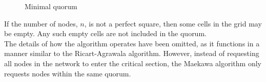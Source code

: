 \begin{figure}[htbp]
  \centering
  
  \caption{Minimal quorum}
  \label{fig:maekawa_minimal}
\end{figure}


If the number of nodes, $n$, is not a perfect square, then some cells in the grid may be empty. Any such empty cells are not included in the quorum.\\

The details of how the algorithm operates have been omitted, as it functions in a manner similar to the Ricart-Agrawala algorithm. However, instead of requesting all nodes in the network to enter the critical section, the Maekawa algorithm only requests nodes within the same quorum.


